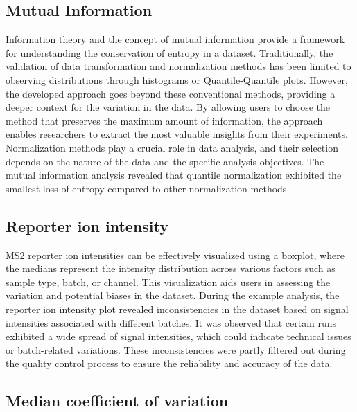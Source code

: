 \documentclass[
  11pt,
]{article}
\begin{document}
\hypertarget{mutual-information}{%
\subsection{Mutual Information}\label{mutual-information}}

Information theory and the concept of mutual information provide a framework for understanding the conservation of entropy in a dataset. Traditionally, the validation of data transformation and normalization methods has been limited to observing distributions through histograms or Quantile-Quantile plots. However, the developed approach goes beyond these conventional methods, providing a deeper context for the variation in the data. By allowing users to choose the method that preserves the maximum amount of information, the approach enables researchers to extract the most valuable insights from their experiments.
Normalization methods play a crucial role in data analysis, and their selection depends on the nature of the data and the specific analysis objectives. The mutual information analysis revealed that quantile normalization exhibited the smallest loss of entropy compared to other normalization methods

\hypertarget{reporter-ion-intensity}{%
\subsection{Reporter ion intensity}\label{reporter-ion-intensity}}

MS2 reporter ion intensities can be effectively visualized using a boxplot, where the medians represent the intensity distribution across various factors such as sample type, batch, or channel. This visualization aids users in assessing the variation and potential biases in the dataset.
During the example analysis, the reporter ion intensity plot revealed inconsistencies in the dataset based on signal intensities associated with different batches. It was observed that certain runs exhibited a wide spread of signal intensities, which could indicate technical issues or batch-related variations. These inconsistencies were partly filtered out during the quality control process to ensure the reliability and accuracy of the data.

\hypertarget{median-coefficient-of-variation}{%
\subsection{Median coefficient of variation}\label{median-coefficient-of-variation}}
\end{document}
